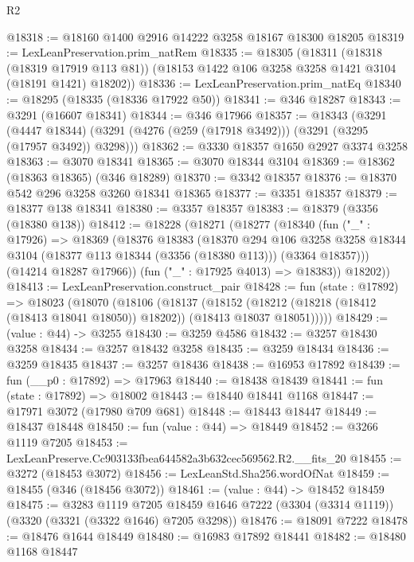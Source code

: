 \begin{lexlean}{R2}
\begin{coremodule}
@18318 := @18160 @1400 @2916 @14222 @3258 @18167 @18300 @18205
@18319 := LexLeanPreservation.prim_natRem
@18335 := @18305
    (@18311
      (@18318 (@18319 @17919 @113 @81))
      (@18153 @1422 @106 @3258 @3258 @1421 @3104 (@18191 @1421) @18202))
@18336 := LexLeanPreservation.prim_natEq
@18340 := @18295 (@18335 (@18336 @17922 @50))
@18341 := @346 @18287
@18343 := @3291 (@16607 @18341)
@18344 := @346 @17966
@18357 := @18343
    (@3291
      (@4447 @18344)
      (@3291 (@4276 (@259 (@17918 @3492))) (@3291 (@3295 (@17957 @3492)) @3298)))
@18362 := @3330 @18357 @1650 @2927 @3374 @3258
@18363 := @3070 @18341
@18365 := @3070 @18344 @3104
@18369 := @18362 (@18363 @18365) (@346 @18289)
@18370 := @3342 @18357
@18376 := @18370 @542 @296 @3258 @3260 @18341 @18365
@18377 := @3351 @18357
@18379 := @18377 @138 @18341
@18380 := @3357 @18357
@18383 := @18379 (@3356 (@18380 @138))
@18412 := @18228
    (@18271
      (@18277
        (@18340
          (fun ("_" : @17926) =>
          @18369
            (@18376
              @18383
              (@18370
                @294
                @106
                @3258
                @3258
                @18344
                @3104
                (@18377 @113 @18344 (@3356 (@18380 @113)))
                (@3364 @18357)))
            (@14214 @18287 @17966))
          (fun ("_" : @17925 @4013) => @18383))
        @18202))
@18413 := LexLeanPreservation.construct_pair
@18428 := fun (state : @17892) =>
  @18023
    (@18070
      (@18106
        (@18137
          (@18152
            (@18212 (@18218 (@18412 (@18413 @18041 @18050)) @18202))
            (@18413 @18037 @18051)))))
@18429 := (value : @44) -> @3255
@18430 := @3259 @4586
@18432 := @3257 @18430 @3258
@18434 := @3257 @18432 @3258
@18435 := @3259 @18434
@18436 := @3259 @18435
@18437 := @3257 @18436
@18438 := @16953 @17892
@18439 := fun (__p0 : @17892) => @17963
@18440 := @18438 @18439
@18441 := fun (state : @17892) => @18002
@18443 := @18440 @18441 @1168
@18447 := @17971 @3072 (@17980 @709 @681)
@18448 := @18443 @18447
@18449 := @18437 @18448
@18450 := fun (value : @44) => @18449
@18452 := @3266 @1119 @7205
@18453 := LexLeanPreserve.Cc903133fbea644582a3b632cec569562.R2.__fits_20
@18455 := @3272 (@18453 @3072)
@18456 := LexLeanStd.Sha256.wordOfNat
@18459 := @18455 (@346 (@18456 @3072))
@18461 := (value : @44) -> @18452 @18459
@18475 := @3283
    @1119
    @7205
    @18459
    @1646
    @7222
    (@3304 (@3314 @1119))
    (@3320 (@3321 (@3322 @1646) @7205 @3298))
@18476 := @18091 @7222
@18478 := @18476 @1644 @18449
@18480 := @16983 @17892 @18441
@18482 := @18480 @1168 @18447

\end{coremodule}
\end{lexlean}
